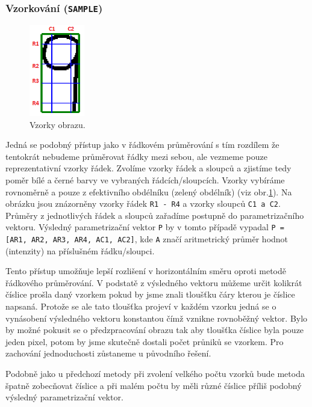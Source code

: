\documentclass[12pt]{article}
\begin{document}
\subsubsection{Vzorkování (\texttt{SAMPLE})}
\begin{figure}
\centering
\vspace{-0.5cm}
\includegraphics[height=4cm]{Samples.png}
\caption{Vzorky obrazu.}
\label{obr2}
\end{figure}

Jedná se podobný přístup jako v řádkovém průměrování s tím rozdílem že tentokrát nebudeme průměrovat řádky mezi sebou, ale vezmeme pouze reprezentativní vzorky řádek. Zvolíme vzorky řádek a sloupců a zjistíme tedy poměr bílé a černé barvy ve vybraných řádcích/sloupcích. Vzorky vybíráme rovnoměrně a pouze z efektivního obdélníku (zelený obdélník) (viz obr.\ref{obr2}). Na obrázku jsou znázorněny vzorky řádek \texttt{R1 - R4} a vzorky sloupců \texttt{C1 a C2}. Průměry z jednotlivých řádek a sloupců zařadíme postupně do parametrizačního vektoru. Výsledný parametrizační vektor \texttt{P} by v tomto případě vypadal \texttt{P = [AR1, AR2, AR3, AR4, AC1, AC2]}, kde \texttt{A} značí aritmetrický průměr hodnot (intenzity) na příslušném řádku/sloupci.

Tento přístup umožňuje lepší rozlišení v horizontálním směru oproti metodě řádkového průměrování. V podstatě z výsledného vektoru můžeme určit kolikrát číslice prošla daný vzorkem pokud by jsme znali tloušťku čáry kterou je číslice napsaná. Protože se ale tato tloušťka projeví v každém vzorku jedná se o vynásobení výsledného vektoru konstantou čímž vznikne rovnoběžný vektor. Bylo by možné pokusit se o předzpracování obrazu tak aby tloušťka číslice byla pouze jeden pixel, potom by jsme skutečně dostali počet průniků se vzorkem. Pro zachování jednoduchosti zůstaneme u původního řešení.

Podobně jako u předchozí metody při zvolení velkého počtu vzorků bude metoda špatně zobecňovat číslice a při malém počtu by měli různé číslice příliš podobný výsledný parametrizační vektor.
\pagebreak
\end{document}
